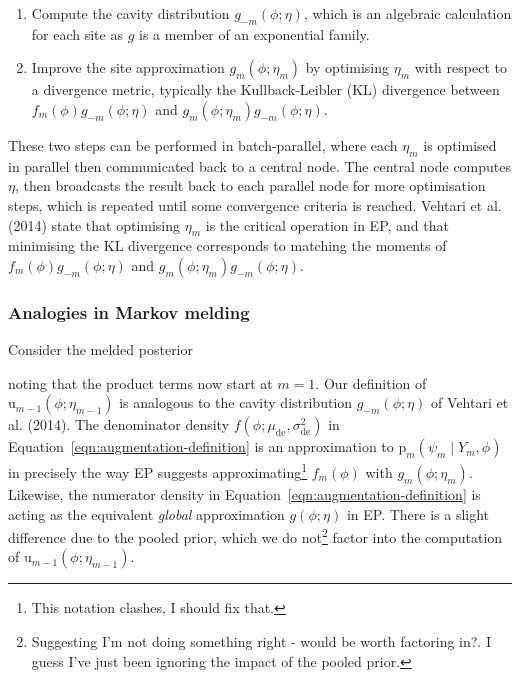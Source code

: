 \documentclass[10pt,a4paper,]{article}
\providecommand{\tightlist}{%
  \setlength{\itemsep}{0pt}\setlength{\parskip}{0pt}}
\let\rmarkdownfootnote\footnote%
\def\footnote{\protect\rmarkdownfootnote}
\newcommand{\pd}{\text{p}}
\newcommand{\tarw}{\text{u}}
\newcommand{\modelindex}{m}
\begin{document}
\begin{enumerate}
\def\labelenumi{\arabic{enumi}.}
\tightlist
\item
  Compute the cavity distribution \(g_{-\modelindex}(\phi; \eta)\),
  which is an algebraic calculation for each site as \(g\) is a member
  of an exponential family.
\item
  Improve the site approximation
  \(g_{\modelindex}(\phi; \eta_{\modelindex})\) by optimising
  \(\eta_{\modelindex}\) with respect to a divergence metric, typically
  the Kullback-Leibler (KL) divergence between
  \(f_{\modelindex}(\phi) g_{-\modelindex}(\phi; \eta)\) and
  \(g_{\modelindex}(\phi; \eta_{\modelindex}) g_{-\modelindex}(\phi; \eta)\).
\end{enumerate}

These two steps can be performed in batch-parallel, where each
\(\eta_{\modelindex}\) is optimised in parallel then communicated back
to a central node. The central node computes \(\eta\), then broadcasts
the result back to each parallel node for more optimisation steps, which
is repeated until some convergence criteria is reached. Vehtari et al.
(2014) state that optimising \(\eta_{\modelindex}\) is the critical
operation in EP, and that minimising the KL divergence corresponds to
matching the moments of
\(f_{\modelindex}(\phi) g_{-\modelindex}(\phi; \eta)\) and
\(g_{\modelindex}(\phi; \eta_{\modelindex}) g_{-\modelindex}(\phi; \eta)\).

\subsubsection{Analogies in Markov
melding}\label{analogies-in-markov-melding}

Consider the melded posterior

noting that the product terms now start at \(\modelindex = 1\). Our
definition of \(\tarw_{\modelindex - 1}(\phi; \eta_{\modelindex - 1})\)
is analogous to the cavity distribution \(g_{-\modelindex}(\phi; \eta)\)
of Vehtari et al. (2014). The denominator density
\(f(\phi; \mu_{\text{de}}, \sigma^{2}_{\text{de}})\) in
Equation~\eqref{eqn:augmentation-definition} is an approximation to
\(\pd_{\modelindex}(\psi_{\modelindex} \mid Y_{\modelindex}, \phi)\) in
precisely the way EP suggests approximating\footnote{This notation
  clashes, I should fix that.} \(f_{\modelindex}(\phi)\) with
\(g_{\modelindex}(\phi; \eta_{\modelindex})\). Likewise, the numerator
density in Equation~\eqref{eqn:augmentation-definition} is acting as the
equivalent \emph{global} approximation \(g(\phi; \eta)\) in EP. There is
a slight difference due to the pooled prior, which we do not\footnote{Suggesting
  I'm not doing something right - would be worth factoring in?. I guess
  I've just been ignoring the impact of the pooled prior.} factor into
the computation of
\(\tarw_{\modelindex - 1}(\phi; \eta_{\modelindex - 1})\).
\end{document}
